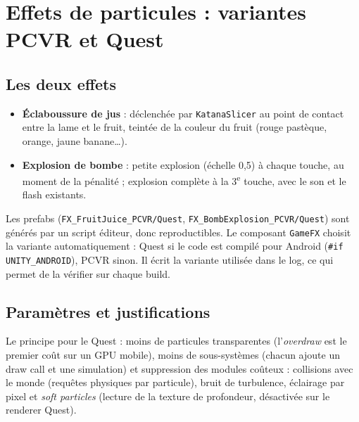 \documentclass[11pt,a4paper]{article}
\begin{document}
\section{Effets de particules : variantes PCVR et Quest}
\label{sec:fx}

\subsection{Les deux effets}

\begin{itemize}
\item \textbf{Éclaboussure de jus} : déclenchée par \texttt{KatanaSlicer} au point de contact entre la lame
  et le fruit, teintée de la couleur du fruit (rouge pastèque, orange, jaune banane\ldots).
\item \textbf{Explosion de bombe} : petite explosion (échelle 0,5) à chaque touche, au moment de la pénalité ;
  explosion complète à la 3\textsuperscript{e} touche, avec le son et le flash existants.
\end{itemize}

Les prefabs (\texttt{FX\_FruitJuice\_PCVR/Quest}, \texttt{FX\_BombExplosion\_PCVR/Quest}) sont générés
par un script éditeur, donc reproductibles. Le composant \texttt{GameFX} choisit la variante
automatiquement : Quest si le code est compilé pour Android (\texttt{\#if UNITY\_ANDROID}), PCVR sinon.
Il écrit la variante utilisée dans le log, ce qui permet de la vérifier sur chaque build.

\subsection{Paramètres et justifications}

Le principe pour le Quest : moins de particules transparentes (l'\emph{overdraw} est le premier coût sur
un GPU mobile), moins de sous-systèmes (chacun ajoute un draw call et une simulation) et suppression des
modules coûteux : collisions avec le monde (requêtes physiques par particule), bruit de turbulence,
éclairage par pixel et \emph{soft particles} (lecture de la texture de profondeur, désactivée sur le
renderer Quest).
\end{document}
